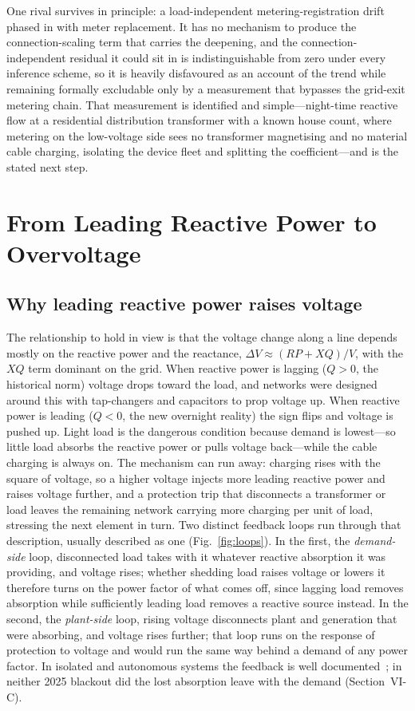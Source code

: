 \documentclass[journal]{IEEEtran}
\begin{document}
One rival survives in principle: a load-independent metering-registration drift phased in with meter
replacement. It has no mechanism to produce the connection-scaling term that
carries the deepening, and the connection-independent residual it could sit in
is indistinguishable from zero under every inference scheme, so it is heavily
disfavoured as an account of
the trend while remaining formally excludable only by a measurement that bypasses
the grid-exit metering chain. That measurement is identified and simple---night-time reactive
flow at a residential distribution transformer with a known house count, where
metering on the low-voltage side sees no transformer magnetising and no material
cable charging, isolating the device fleet and splitting the coefficient---and
is the stated next step.

\section{From Leading Reactive Power to Overvoltage}
\subsection{Why leading reactive power raises voltage}
The relationship to hold in view is that the voltage change along a line depends
mostly on the reactive power and the reactance, $\Delta V \approx (RP+XQ)/V$, with
the $XQ$ term dominant on the grid. When reactive power is lagging ($Q>0$, the
historical norm) voltage drops toward the load, and networks were designed around
this with tap-changers and capacitors to prop voltage up. When reactive power is
leading ($Q<0$, the new overnight reality) the sign flips and voltage is pushed up.
Light load is the dangerous condition because demand is lowest---so little load
absorbs the reactive power or pulls voltage back---while the cable charging is always on. The
mechanism can run away: charging rises with the square of voltage, so a higher
voltage injects more leading reactive power and raises voltage further, and a
protection trip that disconnects a transformer or load leaves the remaining
network carrying more charging per unit of load, stressing the next element in
turn. Two distinct feedback loops run through that description, usually
described as one (Fig.~\ref{fig:loops}). In the first, the \emph{demand-side} loop, disconnected load
takes with it whatever reactive absorption it was providing, and voltage rises;
whether shedding load raises voltage or lowers it therefore turns on the power
factor of what comes off, since lagging load removes absorption while
sufficiently leading load removes a reactive source instead. In the second, the
\emph{plant-side} loop, rising voltage disconnects plant and generation that
were absorbing, and voltage rises further; that loop runs on the response of
protection to voltage and would run the same way behind a demand of any power
factor. In isolated and autonomous systems the feedback is well
documented~\cite{vournas2021,psarros2022}; in neither 2025 blackout did
the lost absorption leave with the demand (Section~VI-C).
\end{document}
